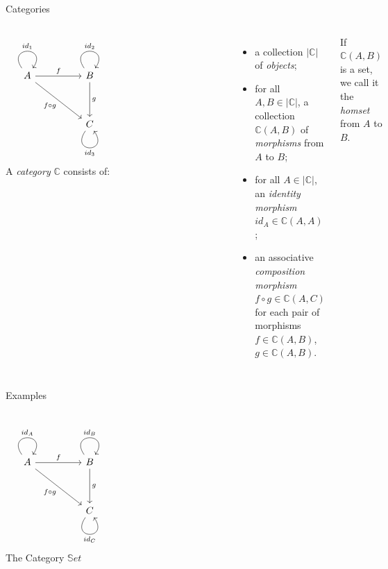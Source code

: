 \documentclass[aspectratio=169]{beamer} %
\newcommand{\bC}{\mathbb{C}}
\begin{document}
{\begin{frame}[fragile]{Categories}
\begin{columns}
\[\begin{tikzcd}
	A && B \\
	\\
	&& C &&&&& {}
	\arrow["{id_1}", from=1-1, to=1-1, loop, in=55, out=125, distance=10mm]
	\arrow["f", from=1-1, to=1-3]
	\arrow["{f \circ g}"', from=1-1, to=3-3]
	\arrow["{id_2}", from=1-3, to=1-3, loop, in=55, out=125, distance=10mm]
	\arrow["g", from=1-3, to=3-3]
	\arrow["{id_3}"', from=3-3, to=3-3, loop, in=305, out=235, distance=10mm]
\end{tikzcd}\]
A \textit{category} $\bC$ consists of:
\begin{itemize}
 \pause\item a collection $|\bC|$ of \textit{objects};
 \pause\item for all $A, B \in |\bC|$, a collection $\bC(A, B)$ of \textit{morphisms} from $A$ to $B$;
 \pause\item for all $A \in |\bC|$, an \textit{identity morphism} $id_A \in \bC(A, A)$;
 \pause\item an associative \textit{composition morphism} $f \circ g \in \bC(A,C)$ for each pair of morphisms $f \in \bC(A,B)$, $g \in \bC(A,B)$.
\end{itemize}
If $\bC(A, B)$ is a set, we call it the \textit{homset} from $A$ to $B$.
\end{columns}
\end{frame}
\begin{frame}[fragile]{Examples}
\begin{columns}
\[\begin{tikzcd}
	A && B \\
	\\
	&& C &&&&& {}
	\arrow["{id_A}", from=1-1, to=1-1, loop, in=55, out=125, distance=10mm]
	\arrow["{f}", from=1-1, to=1-3]
	\arrow["{f \circ g}"', from=1-1, to=3-3]
	\arrow["{id_B}", from=1-3, to=1-3, loop, in=55, out=125, distance=10mm]
	\arrow["{g}", from=1-3, to=3-3]
	\arrow["{id_C}"', from=3-3, to=3-3, loop, in=305, out=235, distance=10mm]
\end{tikzcd}\]
The Category $\mathbb{S}et$
\begin{itemize}

\end{itemize}
\end{columns}
\end{frame}}
\end{document}
